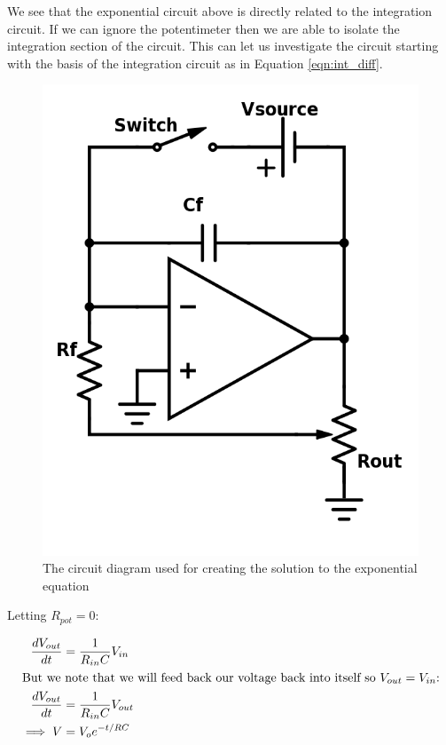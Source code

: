 We see that the exponential circuit above is directly related to the integration circuit. If we can ignore the potentimeter then we are able to isolate the integration section of the circuit. This can let us investigate the circuit starting with the basis of the integration circuit as in Equation \ref{eqn:int_diff}.

\begin{figure}[ht!]
\centering
\includegraphics[scale=.2]{figures/460-17-4-Exponential.png}
\caption{The circuit diagram used for creating the solution to the exponential equation}
\label{fig:CD_Exp}
\end{figure}

Letting $R_{pot}=0$:

\begin{align*}
    \frac{dV_{out}}{dt} &= \frac{1}{R_{in} C} V_{in}\\
\shortintertext{But we note that we will feed back our voltage back into itself so $V_{out} = V_{in}$:}
    \frac{dV_{out}}{dt} &= \frac{1}{R_{in} C} V_{out}\\
    \implies V &= V_o e^{-t/RC}\\
\end{align*}

